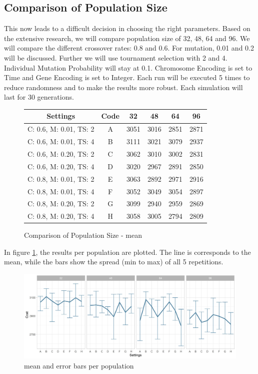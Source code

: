 \subsection{Comparison of Population Size}
This now leads to a difficult decision in choosing the right parameters. Based on the extensive research, we will compare population size of 32, 48, 64 and 96. We will compare the different crossover rates: 0.8 and 0.6. For mutation, 0.01 and 0.2 will be discussed. Further we will use tournament selection with 2 and 4.
Individual Mutation Probability will stay at 0.1. Chromosome Encoding is set to Time and Gene Encoding is set to Integer. 
Each run will be executed 5 times to reduce randomness and to make the results more robust. Each simulation will last for 30 generations.

\begin{figure}[ht]
	\centering
\begin{tabular}{ c|c|cccc  }
	\hline
	Settings & Code & 32 & 48 & 64 & 96\\
	\hline
	C: 0.6, M: 0.01, TS: 2   	& A & 3051 & 3016 & 2851 & 2871\\
	C: 0.6, M: 0.01, TS: 4		& B & 3111 & 3021 & 3079 & 2937\\
	C: 0.6, M: 0.20, TS: 2 		& C & 3062 & 3010 & 3002 & 2831\\
	C: 0.6, M: 0.20, TS: 4    	& D & 3020 & 2967 & 2891 & 2850\\
	C: 0.8, M: 0.01, TS: 2   	& E & 3063 & 2892 & 2971 & 2916\\
	C: 0.8, M: 0.01, TS: 4		& F & 3052 & 3049 & 3054 & 2897\\
	C: 0.8, M: 0.20, TS: 2 		& G & 3099 & 2940 & 2959 & 2869\\
	C: 0.8, M: 0.20, TS: 4    	& H & 3058 & 3005 & 2794 & 2809\\
	\hline
\end{tabular}
\caption{Comparison of Population Size - mean}
\end{figure}


In figure \ref{figure:population:results}, the results per population are plotted. The line is corresponds to the mean, while the bars show the spread (min to max) of all 5 repetitions.
\begin{figure}[ht] 
	\includegraphics[width=1\linewidth]{simulations/population/plots/comparison}
	\caption{mean and error bars per population}
		\label{figure:population:results}
\end{figure}


